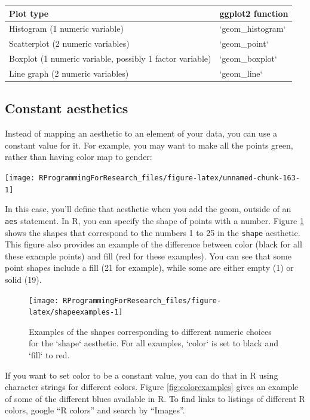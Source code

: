 \documentclass[]{book}
\theoremstyle{definition}
\theoremstyle{definition}
\theoremstyle{definition}
\theoremstyle{remark}
\begin{document}
\begin{tabular}{l|l}
\hline
Plot type & ggplot2 function\\
\hline
Histogram (1 numeric variable) & `geom\_histogram`\\
\hline
Scatterplot (2 numeric variables) & `geom\_point`\\
\hline
Boxplot (1 numeric variable, possibly 1 factor variable) & `geom\_boxplot`\\
\hline
Line graph (2 numeric variables) & `geom\_line`\\
\hline
\end{tabular}

\subsection{Constant aesthetics}\label{constant-aesthetics}

Instead of mapping an aesthetic to an element of your data, you can use
a constant value for it. For example, you may want to make all the
points green, rather than having color map to gender:

\begin{center}\texttt{[image: RProgrammingForResearch\_files/figure-latex/unnamed-chunk-163-1]} \end{center}

In this case, you'll define that aesthetic when you add the geom,
outside of an \texttt{aes} statement. In R, you can specify the shape of
points with a number. Figure \ref{fig:shapeexamples} shows the shapes
that correspond to the numbers 1 to 25 in the \texttt{shape} aesthetic.
This figure also provides an example of the difference between color
(black for all these example points) and fill (red for these examples).
You can see that some point shapes include a fill (21 for example),
while some are either empty (1) or solid (19).

\begin{figure}

{\centering \texttt{[image: RProgrammingForResearch\_files/figure-latex/shapeexamples-1]} 

}

\caption{Examples of the shapes corresponding to different numeric choices for the `shape` aesthetic. For all examples, `color` is set to black and `fill` to red.}\label{fig:shapeexamples}
\end{figure}

If you want to set color to be a constant value, you can do that in R
using character strings for different colors. Figure
\ref{fig:colorexamples} gives an example of some of the different blues
available in R. To find links to listings of different R colors, google
``R colors'' and search by ``Images''.
\end{document}
